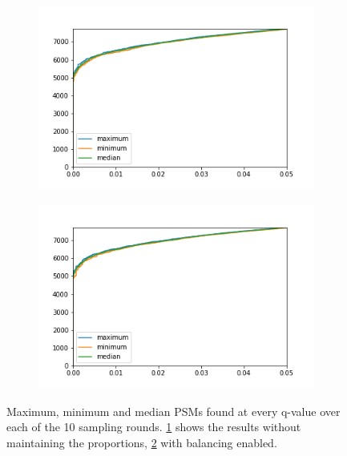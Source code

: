 \begin{figure}
	\normalsize
	\centering
	\begin{subfigure}{0.49 \textwidth}
		\includegraphics[width = \textwidth]{figures/MaxMinMedian_no_balancing.png}
		\caption{}
		\label{fig:results:maxminmedian_not_maintained}
	\end{subfigure}
	\hfill
	\begin{subfigure}{0.49 \textwidth}
		\includegraphics[width = \textwidth]{figures/MaxMinMedian_balancing.png}
		\caption{}
		\label{fig:results:maxminmedian_maintained}
	\end{subfigure}
	\caption[pseudo ROCs with and without balancing of classes]{Maximum, minimum and median PSMs found at every q-value over each of the 10 sampling rounds. \ref{fig:results:maxminmedian_not_maintained} shows the results without maintaining the proportions, \ref{fig:results:maxminmedian_maintained} with balancing enabled.}
	\label{fig:results:maxminmedian}
\end{figure}
